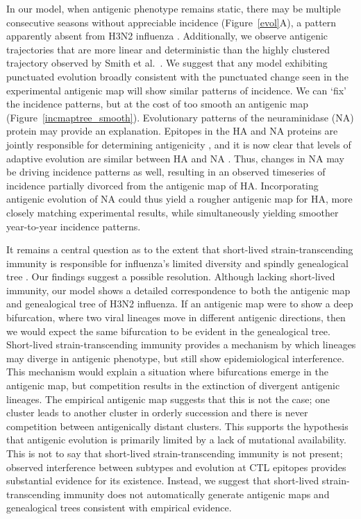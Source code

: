 \documentclass[11pt,oneside,letterpaper]{article}
\begin{document}
In our model, when antigenic phenotype remains static, there may be multiple consecutive seasons without appreciable incidence (Figure~\ref{evol}A), a pattern apparently absent from H3N2 influenza \cite{Finkelman07}.  Additionally, we observe antigenic trajectories that are more linear and deterministic than the highly clustered trajectory observed by Smith et al.\ \cite{Smith04}.  We suggest that any model exhibiting punctuated evolution broadly consistent with the punctuated change seen in the experimental antigenic map will show similar patterns of incidence.  We can `fix' the incidence patterns, but at the cost of too smooth an antigenic map (Figure~\ref{incmaptree_smooth}).  Evolutionary patterns of the neuraminidase (NA) protein may provide an explanation.  Epitopes in the HA and NA proteins are jointly responsible for determining antigenicity \cite{Nelson07NatRevGenet}, and it is now clear that levels of adaptive evolution are similar between HA and NA \cite{Bhatt11}.  Thus, changes in NA may be driving incidence patterns as well, resulting in an observed timeseries of incidence partially divorced from the antigenic map of HA.  Incorporating antigenic evolution of NA could thus yield a rougher antigenic map for HA, more closely matching experimental results, while simultaneously yielding smoother year-to-year incidence patterns.

It remains a central question as to the extent that short-lived strain-transcending immunity is responsible for influenza's limited diversity and spindly genealogical tree \cite{Ferguson03,Tria05}.  Our findings suggest a possible resolution.  Although lacking short-lived immunity, our model shows a detailed correspondence to both the antigenic map and genealogical tree of H3N2 influenza.  If an antigenic map were to show a deep bifurcation, where two viral lineages move in different antigenic directions, then we would expect the same bifurcation to be evident in the genealogical tree.  Short-lived strain-transcending immunity provides a mechanism by which lineages may diverge in antigenic phenotype, but still show epidemiological interference.  This mechanism would explain a situation where bifurcations emerge in the antigenic map, but competition results in the extinction of divergent antigenic lineages.  The empirical antigenic map \cite{Smith04} suggests that this is not the case; one cluster leads to another cluster in orderly succession and there is never competition between antigenically distant clusters.  This supports the hypothesis that antigenic evolution is primarily limited by a lack of mutational availability.  This is not to say that short-lived strain-transcending immunity is not present; observed interference between subtypes \cite{Ferguson03,Goldstein11} and evolution at CTL epitopes \cite{Voeten00} provides substantial evidence for its existence.  Instead, we suggest that short-lived strain-transcending immunity does not automatically generate antigenic maps and genealogical trees consistent with empirical evidence.
\end{document}
